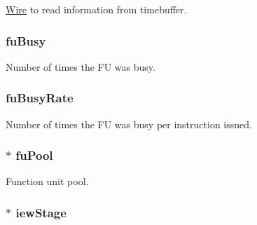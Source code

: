 \label{classInstructionQueue_a0055a92bd94eda21c2641d46ff013dac}
\hyperlink{classWire}{Wire} to read information from timebuffer. \hypertarget{classInstructionQueue_a54dbf1e1683507aefb83115910feb26b}{
\subsubsection[{fuBusy}]{ {\bf fuBusy}}}
\label{classInstructionQueue_a54dbf1e1683507aefb83115910feb26b}
Number of times the FU was busy. \hypertarget{classInstructionQueue_ab1ecb3744ca63dcec2b9b7d80c319c69}{
\subsubsection[{fuBusyRate}]{ {\bf fuBusyRate}}}
\label{classInstructionQueue_ab1ecb3744ca63dcec2b9b7d80c319c69}
Number of times the FU was busy per instruction issued. \hypertarget{classInstructionQueue_a480782fc1cfd21fd9748b26f2a08b97a}{
\subsubsection[{fuPool}]{$\ast$ {\bf fuPool}}}
\label{classInstructionQueue_a480782fc1cfd21fd9748b26f2a08b97a}
Function unit pool. \hypertarget{classInstructionQueue_a4e9ef25d8913b270d432be4bbfe4965c}{
\subsubsection[{iewStage}]{$\ast$ {\bf iewStage}}}
